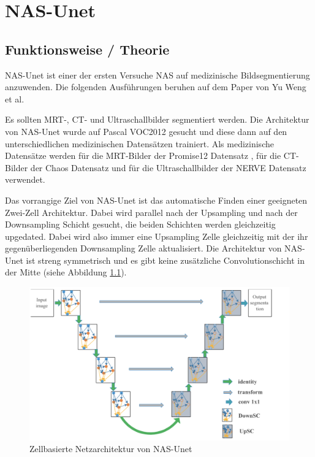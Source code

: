 \chapter{NAS-Unet}
\label{ch:nasunet}



\section{Funktionsweise / Theorie}

NAS-Unet ist einer der ersten Versuche NAS auf medizinische Bildsegmentierung anzuwenden. Die folgenden Ausführungen beruhen auf dem Paper \cite{nasunetPaper} von Yu Weng et al.

Es sollten MRT-, CT- und Ultraschallbilder segmentiert werden. Die Architektur von NAS-Unet wurde auf Pascal VOC2012 \cite{PascalVOCDatensatz} gesucht und diese dann auf den unterschiedlichen medizinischen Datensätzen trainiert. Als medizinische Datensätze werden für die MRT-Bilder der Promise12 Datensatz \cite{Promise12Datensatz}, für die CT-Bilder der Chaos Datensatz \cite{ChaosDatensatz} und für die Ultraschallbilder der NERVE Datensatz \cite{NerveDatensatz} verwendet. 

Das vorrangige Ziel von NAS-Unet ist das automatische Finden einer geeigneten Zwei-Zell Architektur. Dabei wird parallel nach der Upsampling und nach der Downsampling Schicht gesucht, die beiden Schichten werden gleichzeitig upgedated. Dabei wird also immer eine Upsampling Zelle gleichzeitig mit der ihr gegenüberliegenden Downsampling Zelle aktualisiert. Die Architektur von NAS-Unet ist streng symmetrisch und es gibt keine zusätzliche Convolutionschicht in der Mitte (siehe Abbildung \ref{pic:nasUnet_ArchitekturGesamt}). 

\begin{figure}[H]
	
	\centering
	\includegraphics[scale=0.25]{Pictures/nasUnet/Bild1.png}
	\caption{Zellbasierte Netzarchitektur von NAS-Unet \cite{nasunetPaper} }
	\label{pic:nasUnet_ArchitekturGesamt}
\end{figure}

